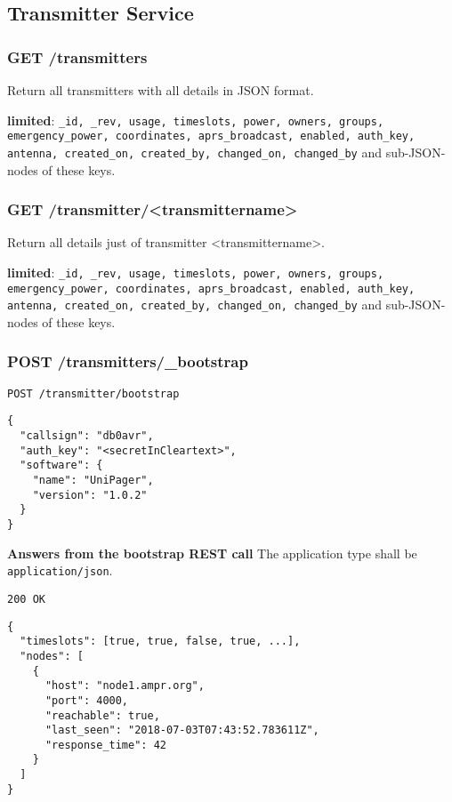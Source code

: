 \subsection{Transmitter Service}

\subsubsection{GET /transmitters}
Return all transmitters with all details in JSON format.

\textbf{limited}: \verb|_id, _rev, usage, timeslots, power, owners, groups, emergency_power, coordinates, aprs_broadcast, enabled, auth_key, antenna, created_on, created_by, changed_on, changed_by| and sub-JSON-nodes of these keys.

\subsubsection{GET /transmitter/<transmittername>}
\label{protocoldef:microservicesapi:database:gettransmitter/transmittername}
Return all details just of transmitter <transmittername>.


\textbf{limited}: \verb|_id, _rev, usage, timeslots, power, owners, groups, emergency_power, coordinates, aprs_broadcast, enabled, auth_key, antenna, created_on, created_by, changed_on, changed_by| and sub-JSON-nodes of these keys.

\subsubsection{POST /transmitters/\_bootstrap}
\label{protcoldef:transmitters:bootstrap}
\texttt{POST /transmitter/bootstrap}
\begin{lstlisting}
{
  "callsign": "db0avr",
  "auth_key": "<secretInCleartext>",
  "software": {
    "name": "UniPager",
    "version": "1.0.2"
  }
}
\end{lstlisting}

\textbf{Answers from the bootstrap REST call}
The application type shall be \verb|application/json|.


\texttt{200 OK}
\begin{lstlisting}
{
  "timeslots": [true, true, false, true, ...],
  "nodes": [
    {
      "host": "node1.ampr.org",
      "port": 4000,
      "reachable": true,
      "last_seen": "2018-07-03T07:43:52.783611Z",
      "response_time": 42
    }
  ]
}
\end{lstlisting}

